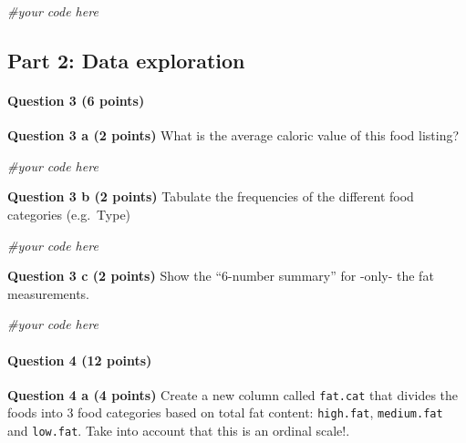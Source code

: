 \documentclass[
  a4paper]{article}
\newenvironment{Shaded}{\begin{snugshade}}{\end{snugshade}}
\newcommand{\CommentTok}[1]{\textcolor[rgb]{0.56,0.35,0.01}{\textit{#1}}}
\begin{document}
\begin{Shaded}
\begin{Highlighting}[]
\CommentTok{#your code here}
\end{Highlighting}
\end{Shaded}

\hypertarget{part-2-data-exploration}{%
\subsection{Part 2: Data exploration}\label{part-2-data-exploration}}

\hypertarget{question-3-6-points}{%
\paragraph{Question 3 (6 points)}\label{question-3-6-points}}

\textbf{Question 3 a (2 points)} What is the average caloric value of
this food listing?

\begin{Shaded}
\begin{Highlighting}[]
\CommentTok{#your code here}
\end{Highlighting}
\end{Shaded}

\textbf{Question 3 b (2 points)} Tabulate the frequencies of the
different food categories (e.g.~Type)

\begin{Shaded}
\begin{Highlighting}[]
\CommentTok{#your code here}
\end{Highlighting}
\end{Shaded}

\textbf{Question 3 c (2 points)} Show the ``6-number summary'' for
-only- the fat measurements.

\begin{Shaded}
\begin{Highlighting}[]
\CommentTok{#your code here}
\end{Highlighting}
\end{Shaded}

\hypertarget{question-4-12-points}{%
\paragraph{Question 4 (12 points)}\label{question-4-12-points}}

\textbf{Question 4 a (4 points)} Create a new column called
\texttt{fat.cat} that divides the foods into 3 food categories based on
total fat content: \texttt{high.fat}, \texttt{medium.fat} and
\texttt{low.fat}. Take into account that this is an ordinal scale!.
\end{document}
